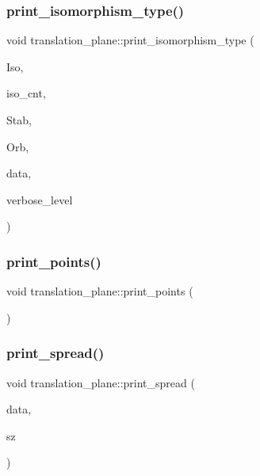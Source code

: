 \subsubsection{\texorpdfstring{print\+\_\+isomorphism\+\_\+type()}{print\_isomorphism\_type()}}
{\footnotesize\ttfamily void translation\+\_\+plane\+::print\+\_\+isomorphism\+\_\+type (\begin{DoxyParamCaption}\item[{\mbox{\hyperlink{classisomorph}{isomorph}} $\ast$}]{Iso,  }\item[{\mbox{\hyperlink{galois_8h_a09fddde158a3a20bd2dcadb609de11dc}{I\+NT}}}]{iso\+\_\+cnt,  }\item[{\mbox{\hyperlink{classsims}{sims}} $\ast$}]{Stab,  }\item[{\mbox{\hyperlink{classschreier}{schreier}} \&}]{Orb,  }\item[{\mbox{\hyperlink{galois_8h_a09fddde158a3a20bd2dcadb609de11dc}{I\+NT}} $\ast$}]{data,  }\item[{\mbox{\hyperlink{galois_8h_a09fddde158a3a20bd2dcadb609de11dc}{I\+NT}}}]{verbose\+\_\+level }\end{DoxyParamCaption})}

\mbox{\label{classtranslation__plane_a699bb10323821531545b0aeda1237353}} 
\subsubsection{\texorpdfstring{print\+\_\+points()}{print\_points()}}
{\footnotesize\ttfamily void translation\+\_\+plane\+::print\+\_\+points (\begin{DoxyParamCaption}{ }\end{DoxyParamCaption})}

\mbox{\label{classtranslation__plane_ad0dc74431d2eac06f805c55475b103d3}} 
\subsubsection{\texorpdfstring{print\+\_\+spread()}{print\_spread()}}
{\footnotesize\ttfamily void translation\+\_\+plane\+::print\+\_\+spread (\begin{DoxyParamCaption}\item[{\mbox{\hyperlink{galois_8h_a09fddde158a3a20bd2dcadb609de11dc}{I\+NT}} $\ast$}]{data,  }\item[{\mbox{\hyperlink{galois_8h_a09fddde158a3a20bd2dcadb609de11dc}{I\+NT}}}]{sz }\end{DoxyParamCaption})}

